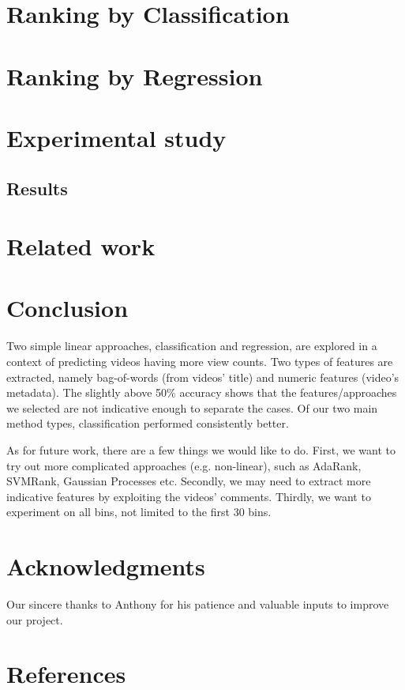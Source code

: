 \documentclass{article} %
\begin{document}
\section{Ranking by Classification}
\label{sec:ranking}
	
\section{Ranking by Regression}
\label{sec:regression}
	
\section{Experimental study}
\label{sec:experiment}
	
\subsection{Results}
\label{sec:results}
	
\section{Related work}
\label{sec:related}
	

\section{Conclusion}
Two simple linear approaches, classification and regression, are explored in a context of predicting videos having more view counts. Two types of features are extracted, namely bag-of-words (from videos' title) and numeric features (video's metadata). The slightly above 50\% accuracy shows that the features/approaches we selected are not indicative enough to separate the cases.  Of our two main method types, classification performed consistently better.

As for future work, there are a few things we would like to do. First, we want to try out more complicated approaches (e.g. non-linear), such as AdaRank, SVMRank, Gaussian Processes etc. Secondly, we may need to extract more indicative features by exploiting the videos' comments. Thirdly, we want to experiment on all bins, not limited to the first 30 bins.

\section*{Acknowledgments}
	Our sincere thanks to Anthony for his patience and valuable inputs to improve our project.

\section*{References}
\label{sec:references}
	
\end{document}
